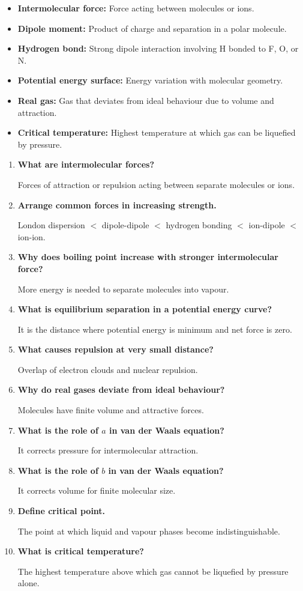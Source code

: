 \documentclass[12pt,a4paper]{article}
\newcommand{\Q}[1]{\textbf{#1}\par\noindent\ignorespaces}
\begin{document}
\begin{tcolorbox}[defbox, title={One-Line Definitions}]
\begin{itemize}[leftmargin=*, itemsep=2pt, topsep=2pt]
  \item \textbf{Intermolecular force:} Force acting between molecules or ions.
  \item \textbf{Dipole moment:} Product of charge and separation in a polar molecule.
  \item \textbf{Hydrogen bond:} Strong dipole interaction involving H bonded to F, O, or N.
  \item \textbf{Potential energy surface:} Energy variation with molecular geometry.
  \item \textbf{Real gas:} Gas that deviates from ideal behaviour due to volume and attraction.
  \item \textbf{Critical temperature:} Highest temperature at which gas can be liquefied by pressure.
\end{itemize}
\end{tcolorbox}

\begin{tcolorbox}[exambox, title={Frequently Asked / Viva Questions}]
\begin{enumerate}[topsep=0pt, label=\textbf{Q\arabic*.}, itemsep=5pt]
  \item \Q{What are intermolecular forces?}
    Forces of attraction or repulsion acting between separate molecules or ions.
  \item \Q{Arrange common forces in increasing strength.}
    London dispersion $<$ dipole-dipole $<$ hydrogen bonding $<$ ion-dipole $<$ ion-ion.
  \item \Q{Why does boiling point increase with stronger intermolecular force?}
    More energy is needed to separate molecules into vapour.
  \item \Q{What is equilibrium separation in a potential energy curve?}
    It is the distance where potential energy is minimum and net force is zero.
  \item \Q{What causes repulsion at very small distance?}
    Overlap of electron clouds and nuclear repulsion.
  \item \Q{Why do real gases deviate from ideal behaviour?}
    Molecules have finite volume and attractive forces.
  \item \Q{What is the role of $a$ in van der Waals equation?}
    It corrects pressure for intermolecular attraction.
  \item \Q{What is the role of $b$ in van der Waals equation?}
    It corrects volume for finite molecular size.
  \item \Q{Define critical point.}
    The point at which liquid and vapour phases become indistinguishable.
  \item \Q{What is critical temperature?}
    The highest temperature above which gas cannot be liquefied by pressure alone.
\end{enumerate}
\end{tcolorbox}
\end{document}
